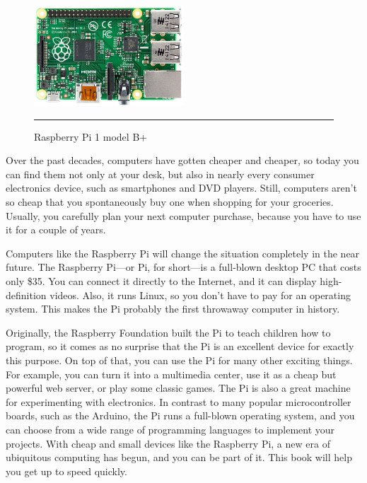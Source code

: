 \begin{figure}
  \begin{center}
    \includegraphics[width=0.5\textwidth]{./Pictures/raspberry_pi_b.jpg}
  \end{center}
  \rule{0.5\textwidth}{0.5pt}
  \caption{Raspberry Pi 1 model B+}
  \label{fig:Raspberry}
\end{figure}

Over the past decades, computers have gotten cheaper and cheaper, so today
you can find them not only at your desk, but also in nearly every consumer
electronics device, such as smartphones and DVD players. Still, computers
aren’t so cheap that you spontaneously buy one when shopping for your
groceries. Usually, you carefully plan your next computer purchase, because
you have to use it for a couple of years.

Computers like the Raspberry Pi will change the situation completely in the
near future. The Raspberry Pi—or Pi, for short—is a full-blown desktop PC
that costs only \$35. You can connect it directly to the Internet, and it can
display high-definition videos. Also, it runs Linux, so you don’t have to pay
for an operating system. This makes the Pi probably the first throwaway
computer in history.

Originally, the Raspberry Foundation \citep{2} built the Pi to teach children how to
program, so it comes as no surprise that the Pi is an excellent device for
exactly this purpose. On top of that, you can use the Pi for many other
exciting things. For example, you can turn it into a multimedia center, use
it as a cheap but powerful web server, or play some classic games.
The Pi is also a great machine for experimenting with electronics. In contrast
to many popular microcontroller boards, such as the Arduino, the Pi runs a
full-blown operating system, and you can choose from a wide range of programming
languages to implement your projects.
With cheap and small devices like the Raspberry Pi, a new era of ubiquitous
computing has begun, and you can be part of it. This book will help you get
up to speed quickly.

